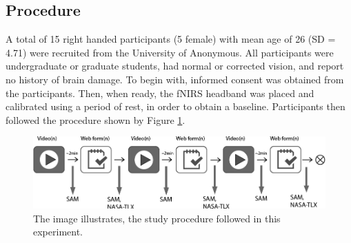 \documentclass[../main/Feedback.tex]{subfiles}
\begin{document}

\subsection{Procedure}
A total of 15 right handed participants (5 female) with mean age of 26 (SD = 4.71) were recruited from the University of Anonymous.
All participants were undergraduate or graduate students, had normal or corrected vision, and report no history of brain damage. %
To begin with, informed consent was obtained from the participants. Then, when ready, the fNIRS headband was placed and calibrated using a period of rest, in order to obtain a baseline. Participants then followed the procedure shown by Figure \ref{fig:study-procedure}.


\begin{figure}[h]
	\centering
	\includegraphics[width=\linewidth]{../figures/study-procedure}
	\caption[study procedure]{The image illustrates, the study procedure followed in this experiment.}
	\label{fig:study-procedure}
\end{figure}
\end{document}
